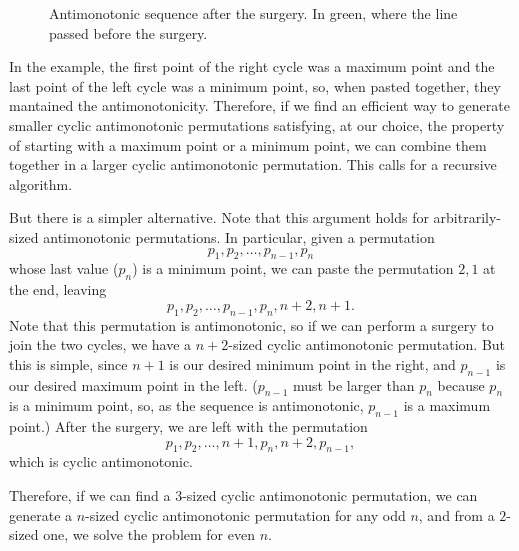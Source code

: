 \documentclass{article}
\begin{document}
\begin{figure}[h]
    \centering
    \caption[Antimonotonic sequence after the surgery.]{
        Antimonotonic sequence after the surgery.
        In green, where the line passed before the surgery.
    }
    \label{fig4}
\end{figure}

In the example,
the first point of the right cycle was a maximum point
and the last point of the left cycle was a minimum point,
so, when pasted together,
they mantained the antimonotonicity.
Therefore,
if we find an efficient way to generate smaller cyclic antimonotonic permutations
satisfying,
at our choice,
the property of starting with a maximum point or a minimum point,
we can combine them together in a larger cyclic antimonotonic permutation.
This calls for a recursive algorithm.

But there is a simpler alternative.
Note that this argument holds for arbitrarily-sized antimonotonic permutations.
In particular, given a permutation
\begin{equation*}
    p_1, p_2, \dots, p_{n-1}, p_n
\end{equation*}
whose last value ($p_n$) is a minimum point,
we can paste the permutation $2, 1$ at the end,
leaving
\begin{equation*}
    p_1, p_2, \dots, p_{n-1}, p_n, n+2, n+1.
\end{equation*}
Note that this permutation is antimonotonic,
so if we can perform a surgery to join the two cycles,
we have a $n+2$-sized cyclic antimonotonic permutation.
But this is simple, since $n+1$ is our desired minimum point in the right,
and $p_{n-1}$ is our desired maximum point in the left.
($p_{n-1}$ must be larger than $p_n$ because $p_n$ is a minimum point,
so, as the sequence is antimonotonic, $p_{n-1}$ is a maximum point.)
After the surgery, we are left with the permutation
\begin{equation*}
    p_1, p_2, \dots, n+1, p_n, n+2, p_{n-1},
\end{equation*}
which is cyclic antimonotonic.

Therefore, if we can find a $3$-sized cyclic antimonotonic permutation,
we can generate a $n$-sized cyclic antimonotonic permutation
for any odd $n$,
and from a $2$-sized one,
we solve the problem for even $n$.
\end{document}
